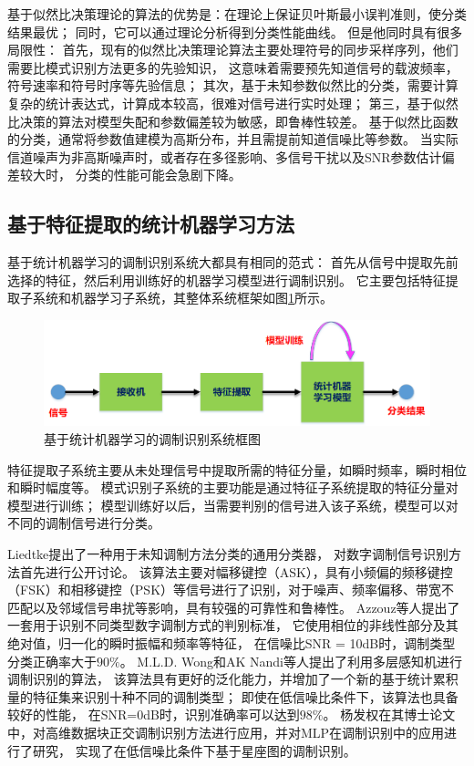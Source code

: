 基于似然比决策理论的算法的优势是：在理论上保证贝叶斯最小误判准则，使分类结果最优；
同时，它可以通过理论分析得到分类性能曲线。
但是他同时具有很多局限性：
首先，现有的似然比决策理论算法主要处理符号的同步采样序列，他们需要比模式识别方法更多的先验知识，
这意味着需要预先知道信号的载波频率，符号速率和符号时序等先验信息；
其次，基于未知参数似然比的分类，需要计算复杂的统计表达式，计算成本较高，很难对信号进行实时处理；
第三，基于似然比决策的算法对模型失配和参数偏差较为敏感，即鲁棒性较差。
基于似然比函数的分类，通常将参数值建模为高斯分布，并且需提前知道信噪比等参数。
当实际信道噪声为非高斯噪声时，或者存在多径影响、多信号干扰以及SNR参数估计偏差较大时，
分类的性能可能会急剧下降。\par
 
\subsection{基于特征提取的统计机器学习方法}

基于统计机器学习的调制识别系统大都具有相同的范式：
首先从信号中提取先前选择的特征，然后利用训练好的机器学习模型进行调制识别。
它主要包括特征提取子系统和机器学习子系统，其整体系统框架如图\ref{sec:fig_1_1}所示。\par

\begin{figure}
	\centering
	\includegraphics[scale=0.6]{figures/chapter_1/fig_1_1}
	\caption{基于统计机器学习的调制识别系统框图} \label{sec:fig_1_1}
\end{figure}

特征提取子系统主要从未处理信号中提取所需的特征分量，如瞬时频率，瞬时相位和瞬时幅度等。 
模式识别子系统的主要功能是通过特征子系统提取的特征分量对模型进行训练；
模型训练好以后，当需要判别的信号进入该子系统，模型可以对不同的调制信号进行分类。\par

Liedtke提出了一种用于未知调制方法分类的通用分类器，
对数字调制信号识别方法首先进行公开讨论\cite{liedtke1984computer}。 
该算法主要对幅移键控（ASK），具有小频偏的频移键控（FSK）和相移键控（PSK）等信号进行了识别，对于噪声、频率偏移、带宽不匹配以及邻域信号串扰等影响，具有较强的可靠性和鲁棒性。 
Azzouz等人提出了一套用于识别不同类型数字调制方式的判别标准，
它使用相位的非线性部分及其绝对值，归一化的瞬时振幅和频率等特征，
在信噪比SNR = 10dB时，调制类型分类正确率大于$90\%$\cite{azzouz1995automatic}。
M.L.D. Wong和AK Nandi等人提出了利用多层感知机进行调制识别的算法，
该算法具有更好的泛化能力，并增加了一个新的基于统计累积量的特征集来识别十种不同的调制类型；
即使在低信噪比条件下，该算法也具备较好的性能，
在SNR=0dB时，识别准确率可以达到$98\%$\cite{wong2001automatic}。
杨发权在其博士论文中，对高维数据块正交调制识别方法进行应用，并对MLP在调制识别中的应用进行了研究，
实现了在低信噪比条件下基于星座图的调制识别\cite{杨发权2015无线通信信号调制识别关键技术与理论研究}。\par


